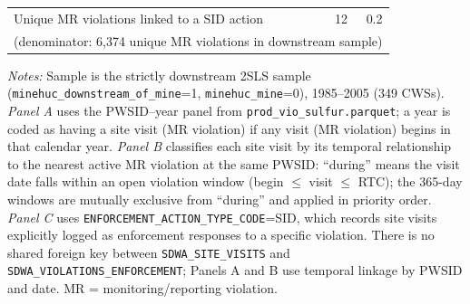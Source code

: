 \begin{table}[htbp]
\begin{tabular}{lrr}
Unique MR violations linked to a SID action & 12 & 0.2 \\
\multicolumn{3}{l}{\footnotesize (denominator: 6,374 unique MR violations in downstream sample)} \\
\hline\hline
\end{tabular}
\begin{minipage}{\linewidth}
\vspace{4pt}
\footnotesize
\textit{Notes:} Sample is the strictly downstream 2SLS sample (\texttt{minehuc\_downstream\_of\_mine}=1, \texttt{minehuc\_mine}=0), 1985--2005 (349 CWSs). \textit{Panel A} uses the PWSID--year panel from \texttt{prod\_vio\_sulfur.parquet}; a year is coded as having a site visit (MR violation) if any visit (MR violation) begins in that calendar year. \textit{Panel B} classifies each site visit by its temporal relationship to the nearest active MR violation at the same PWSID: ``during'' means the visit date falls within an open violation window (begin $\le$ visit $\le$ RTC); the 365-day windows are mutually exclusive from ``during'' and applied in priority order. \textit{Panel C} uses \texttt{ENFORCEMENT\_ACTION\_TYPE\_CODE}=SID, which records site visits explicitly logged as enforcement responses to a specific violation. There is no shared foreign key between \texttt{SDWA\_SITE\_VISITS} and \texttt{SDWA\_VIOLATIONS\_ENFORCEMENT}; Panels A and B use temporal linkage by PWSID and date. MR = monitoring/reporting violation.
\end{minipage}
\end{table}

